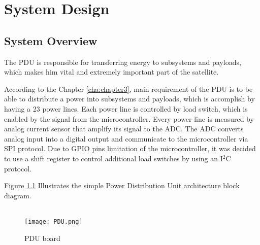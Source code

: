 \chapter{System Design\label{sec:tech77}}

\section{System Overview}
The PDU is responsible for transferring energy to subsystems and payloads, which makes him vital and extremely important part of the satellite. 

 According to the Chapter \ref*{cha:chapter3}, main requirement of the PDU is to be able to distribute a power into subsystems and payloads, which is accomplish by having a 23 power lines. Each power line is controlled by load switch, which is enabled by the signal from the microcontroller. Every power line is measured by analog current sensor that amplify its signal to the ADC. The ADC converts analog input into a digital output and communicate to the microcontroller via SPI protocol. Due to GPIO pins limitation of the microcontroller, it was decided to use a shift register to control additional load switches by using an I$^2$C protocol. 
 
 
  Figure \ref{fig: PDU} Illustrates the simple Power Distribution Unit architecture block diagram.\\ \\


 \begin{figure}[h]
 	\centering
 	\texttt{[image: PDU.png]}
 	\caption{PDU board}
 	\label{fig: PDU}
 \end{figure} 

